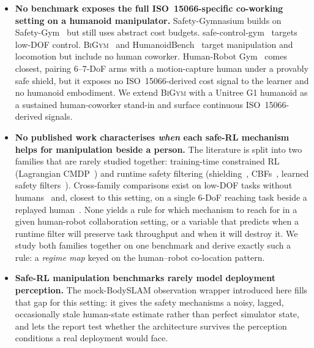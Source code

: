 \documentclass[11pt,a4paper]{report}
\newcommand{\iso}{ISO~15066}
\newcommand{\bigym}{\textsc{BiGym}}
\newcommand{\bodyslampp}{BodySLAM\nolinebreak[4]\hspace{-.05em}\raisebox{.2ex}{\scriptsize ++}}
\begin{document}
\begin{itemize}[topsep=2pt,itemsep=2pt]
\item \textbf{No benchmark exposes the full \iso{}-specific
  co-working setting on a humanoid manipulator.} Safety-Gymnasium
  builds on Safety-Gym~\cite{ray2019safetygym,ji2023safetygymnasium}
  but still uses abstract cost budgets. safe-control-gym~\cite{yuan2022safecontrolgym} targets
  low-DOF control. \bigym{}~\cite{chernyadev2024bigym} and
  HumanoidBench~\cite{sferrazza2024humanoidbench} target manipulation
  and locomotion but include no human coworker. Human-Robot
  Gym~\cite{thumm2024humanrobotgym} comes closest, pairing 6--7-DoF
  arms with a motion-capture human under a provably safe shield, but
  it exposes no \iso{}-derived cost signal to the learner and no
  humanoid embodiment. We extend
  \bigym{} with a Unitree G1 humanoid as a sustained human-coworker
  stand-in and surface continuous \iso{}-derived signals.
\item \textbf{No published work characterises \emph{when} each
  safe-RL mechanism helps for manipulation beside a person.} The
  literature is split into two families that are rarely studied
  together: training-time constrained RL (Lagrangian
  CMDP~\cite{ray2019safetygym,stooke2020pid}) and runtime safety
  filtering (shielding~\cite{alshiekh2018shielding},
  CBFs~\cite{ames2019cbf,shield2025}, learned safety
  filters~\cite{srinivasan2020learning,thananjeyan2021recovery}).
  Cross-family comparisons exist on low-DOF tasks without
  humans~\cite{yuan2022safecontrolgym} and, closest to this setting,
  on a single 6-DoF reaching task beside a replayed
  human~\cite{thumm2023interventions}. None yields a rule for which
  mechanism to reach for in a given human-robot collaboration
  setting, or a variable that predicts when a runtime filter will
  preserve task throughput and when it will destroy it.
  We study both families together on one benchmark and derive exactly
  such a rule: a \emph{regime map} keyed on the human--robot
  co-location pattern.
\item \textbf{Safe-RL manipulation benchmarks rarely model deployment
  perception.} The mock-\bodyslampp{} observation wrapper introduced
  here fills that gap for this setting: it gives the safety mechanisms
  a noisy, lagged, occasionally stale human-state estimate rather than
  perfect simulator state, and lets the report test whether the
  architecture survives the perception conditions a real deployment
  would face.
\end{itemize}
\end{document}
